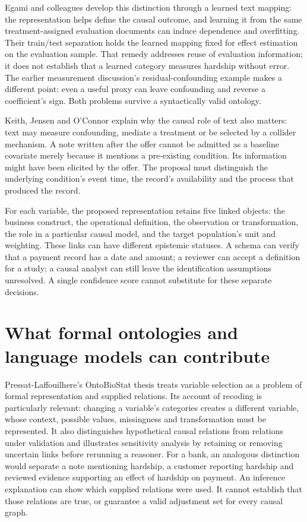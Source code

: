 Egami and colleagues develop this distinction through a learned text mapping:
the representation helps define the causal outcome, and learning it from the
same treatment-assigned evaluation documents can induce dependence and
overfitting. Their train/test separation holds the learned mapping fixed for
effect estimation on the evaluation sample.\citep{exec13_census_texts}
That remedy addresses reuse of evaluation information; it does not establish
that a learned category measures hardship without error. The earlier
measurement discussion's residual-confounding example makes a different
point: even a useful proxy can leave confounding and reverse a coefficient's
sign. Both problems survive a syntactically valid ontology.

Keith, Jensen and O'Connor explain why the causal role of text also matters:
text may measure confounding, mediate a treatment or be selected by a collider
mechanism.\citep{exec13_census_text_review_arxiv} A note written after the offer
cannot be admitted as a baseline covariate merely because it mentions a
pre-existing condition. Its information might have been elicited by the offer.
The proposal must distinguish the underlying condition's event time, the
record's availability and the process that produced the record.

For each variable, the proposed representation retains five linked objects:
the business construct, the operational definition, the observation or
transformation, the role in a particular causal model, and the target
population's unit and weighting. These links can have different epistemic
statuses. A schema can verify that a payment record has a date and amount;
a reviewer can accept a definition for a study; a causal analyst can still
leave the identification assumptions unresolved. A single confidence score
cannot substitute for these separate decisions.

\section{What formal ontologies and language models can contribute}

Pressat-Laffouilhere's OntoBioStat thesis treats variable selection as a problem
of formal representation and supplied relations. Its account of recoding is
particularly relevant: changing a variable's categories creates a different
variable, whose context, possible values, missingness and transformation must
be represented. It also distinguishes hypothetical causal relations from
relations under validation and illustrates sensitivity analysis by retaining
or removing uncertain links before rerunning a reasoner.\citep{exec17_ontology_thesis}
For a bank, an analogous distinction would separate a note mentioning
hardship, a customer reporting hardship and reviewed evidence supporting an
effect of hardship on payment. An inference explanation can show which
supplied relations were used. It cannot establish that those relations are
true, or guarantee a valid adjustment set for every causal graph.

